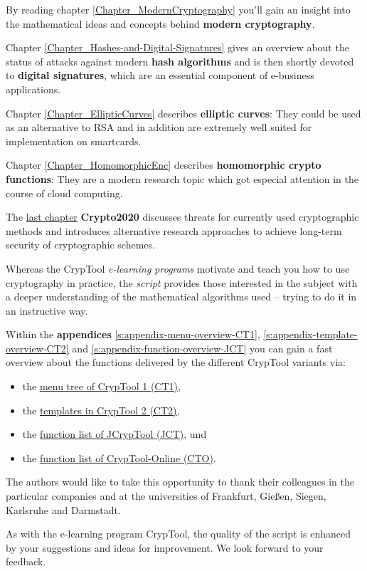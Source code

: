 By reading chapter \ref{Chapter_ModernCryptography}
you'll gain an insight into the mathematical ideas and concepts behind 
{\bf modern cryptography}.

Chapter \ref{Chapter_Hashes-and-Digital-Signatures} gives
an overview about the status of attacks against modern {\bf hash algorithms}
and is then shortly devoted to {\bf digital signatures}, 
which are an essential component of e-business applications.

Chapter \ref{Chapter_EllipticCurves} describes {\bf elliptic curves}:
They could be used as an alternative to RSA and in addition are extremely
well suited for implementation on smartcards.

Chapter \ref{Chapter_HomomorphicEnc} describes {\bf homomorphic crypto functions}:
They are a modern research topic which got especial attention in the course of
cloud computing.

The \hyperlink{Chapter_Crypto2020}{last chapter} {\bf Crypto2020}
discusses threats for currently used cryptographic methods and introduces
alternative research approaches to achieve long-term security
of cryptographic schemes.

Whereas the CrypTool \textit{e-learning programs} motivate
and teach you how to use cryptography in practice, the \textit{script} provides
those interested in the subject with a deeper understanding of the mathematical
algorithms used -- trying to do it in an instructive way.

Within the {\bf appendices} \ref{s:appendix-menu-overview-CT1},
\ref{s:appendix-template-overview-CT2} and \ref{s:appendix-function-overview-JCT}
you can gain a fast overview about the functions delivered by the different CrypTool
variants via:
\begin{itemize}
  \item the \hyperlink{appendix-menu-overview-CT1}{menu tree of CrypTool 1 (CT1)},
  \item the \hyperlink{appendix-template-overview-CT2}{templates in CrypTool 2 (CT2)},
  \item the \hyperlink{appendix-function-overview-JCT}{function list of JCrypTool (JCT)}, und
  \item the \hyperlink{appendix-function-overview-CTO}{function list of CrypTool-Online (CTO)}.
\end{itemize}

The authors would like to take this opportunity to thank their colleagues 
in the particular companies and at the universities of Frankfurt, Gie\ss en, 
Siegen, Karlsruhe and Darmstadt.

\enlargethispage{12pt}
As with the e-learning program CrypTool, the quality of the 
script is enhanced by your suggestions and ideas for improvement. 
We look forward to your feedback.


